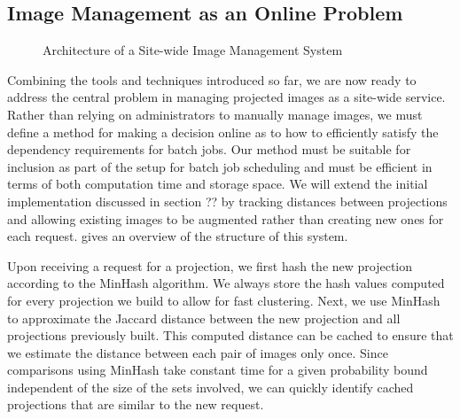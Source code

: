 \documentclass[sigconf]{acmart}
\begin{document}
\subsection{Image Management as an Online Problem}

\begin{figure}[t]
\centering
{}
\caption{Architecture of a Site-wide Image Management System}
\label{figure:sys-arch}
\end{figure}

Combining the tools and techniques introduced so far,
we are now ready to address the central problem in managing projected images as a site-wide service.
Rather than relying on administrators to manually manage images,
we must define a method for making a decision online as to how to efficiently satisfy the dependency requirements for batch jobs.
Our method must be suitable for inclusion as part of the setup for batch job scheduling and must be efficient in terms of both computation time and storage space.
We will extend the initial implementation discussed in section ?? by tracking distances between projections and allowing existing images to be augmented rather than creating new ones for each request.
 gives an overview of the structure of this system.

Upon receiving a request for a projection,
we first hash the new projection according to the MinHash algorithm.
We always store the hash values computed for every projection we build to allow for fast clustering.
Next, we use MinHash to approximate the Jaccard distance between the new projection and all projections previously built.
This computed distance can be cached to ensure that we estimate the distance between each pair of images only once.
Since comparisons using MinHash take constant time for a given probability bound independent of the size of the sets involved,
we can quickly identify cached projections that are similar to the new request.
\end{document}
